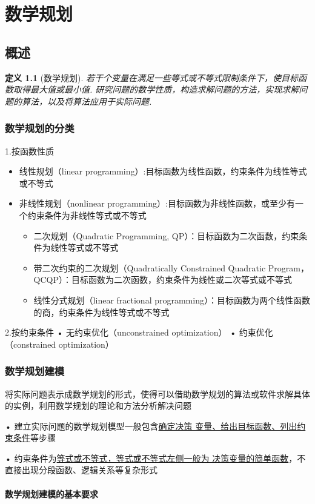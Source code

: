 \documentclass[10t, a4paper, oneside]{ctexbook}
\newtheorem{definition}[theorem]{定义}
\begin{document}
\newpage
\chapter{数学规划}
\section{概述}
\begin{definition}[数学规划]
    若干个变量在满足一些等式或不等式限制条件下，使目标函数取得最大值或最小值.
研究问题的数学性质，构造求解问题的方法，实现求解问题的算法，以及将算法应用于实际问题.
\end{definition}

\subsection{数学规划的分类}
1.按函数性质
\begin{itemize}
    \item 线性规划（linear programming）:目标函数为线性函数，约束条件为线性等式或不等式
    \item 非线性规划（nonlinear programming）:目标函数为非线性函数，或至少有一个约束条件为非线性等式或不等式
    \begin{itemize} 
        \item 二次规划（Quadratic Programming, QP）：目标函数为二次函数，约束条件为线性等式或不等式
        \item 带二次约束的二次规划（Quadratically Constrained Quadratic Program， QCQP）：目标函数为二次函数，约束条件为线性或二次等式或不等式
        \item 线性分式规划（linear fractional programming）：目标函数为两个线性函数的商，约束条件为线性等式或不等式
    \end{itemize}
\end{itemize}
2.按约束条件
• 无约束优化（unconstrained optimization）
• 约束优化（constrained optimization）
\subsection{数学规划建模}
将实际问题表示成数学规划的形式，使得可以借助数学规划的算法或软件求解具体的实例，利用数学规划的理论和方法分析解决问题

• 建立实际问题的数学规划模型一般包含\underline{确定决策
变量、给出目标函数、列出约束条件}等步骤

• 约束条件为\underline{等式或不等式，等式或不等式左侧一般为
决策变量的简单函数}，不直接出现分段函数、逻辑关系等复杂形式
\subsubsection{数学规划建模的基本要求}
\end{document}
